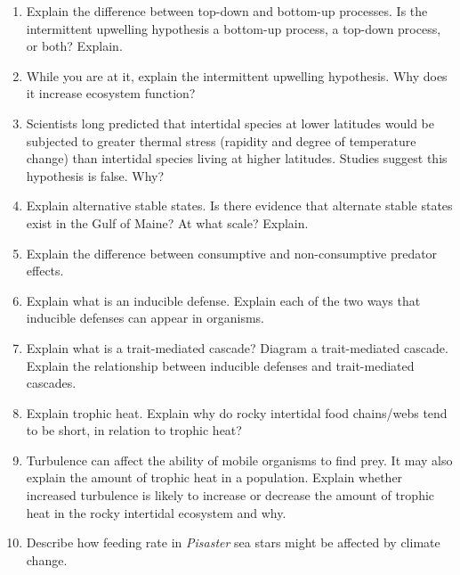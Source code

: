 \documentclass[letterpaper]{tufte-handout}
\begin{document}
\begin{enumerate}
	
	\item Explain the difference between top-down and bottom-up processes.  Is the intermittent upwelling hypothesis a bottom-up process, a top-down process, or both? Explain.
	
	\item While you are at it, explain the intermittent upwelling hypothesis. Why does it increase ecosystem function?
	
	\item Scientists long predicted that intertidal species at lower latitudes would be subjected to greater thermal stress (rapidity and degree of temperature change) than intertidal species living at higher latitudes. Studies suggest this hypothesis is false. Why? 
	
	\item Explain alternative stable states. Is there evidence that alternate stable states exist in the Gulf of Maine? At what scale? Explain.
	
	\item Explain the difference between consumptive and non-consumptive predator effects.
	
	\item Explain what is an inducible defense. Explain  each of the two ways that inducible defenses can appear in organisms.
	
	\item Explain what is a trait-mediated cascade? Diagram a trait-mediated cascade. Explain the relationship between inducible defenses and trait-mediated cascades.

	\item Explain trophic heat. Explain why do rocky intertidal food chains/webs tend to be short, in relation to trophic heat?

	\item Turbulence can affect the ability of mobile organisms to find prey. It may also explain the amount of trophic heat in a population. Explain whether increased turbulence is likely to increase or decrease the amount of trophic heat in the rocky intertidal ecosystem and why.
	
	\item Describe how feeding rate in \textit{Pisaster} sea stars might be affected by climate change. 
	
\end{enumerate}
\end{document}
